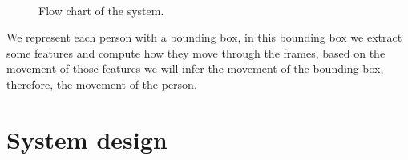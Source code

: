 \begin{figure}[H]
	
\centering

\\


\caption{Flow chart of the system.}
\label{introTracking3}
\end{figure}

We represent each person with a bounding box, in this bounding box we extract some features and compute how they move through the frames, based on the movement of those features we will infer the movement of the bounding box, therefore, the movement of the person.

\section{System design}

